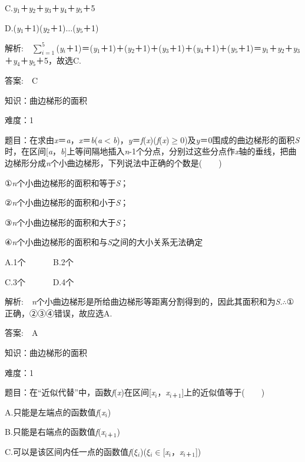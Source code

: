 \documentclass{article} %
\begin{document}
C.\textit{y}${}_{1}$＋\textit{y}${}_{2}$＋\textit{y}${}_{3}$＋\textit{y}${}_{4}$＋\textit{y}${}_{5}$＋5

D.(\textit{y}${}_{1}$＋1)(\textit{y}${}_{2}$＋1){$\dots$}(\textit{y}${}_{5}$＋1)

 解析:　$\sum\limits_{i=1}^5$(\textit{y${}_{i}$}＋1)＝(\textit{y}${}_{1}$＋1)＋(\textit{y}${}_{2}$＋1)＋(\textit{y}${}_{3}$＋1)＋(\textit{y}${}_{4}$＋1)＋(\textit{y}${}_{5}$＋1)＝\textit{y}${}_{1}$＋\textit{y}${}_{2}$＋\textit{y}${}_{3}$＋\textit{y}${}_{4}$＋\textit{y}${}_{5}$＋5，故选C.

 答案:　C



 知识：曲边梯形的面积

 难度：1

 题目：在求由\textit{x}＝\textit{a}，\textit{x}＝\textit{b}(\textit{a}$\mathrm{<}$\textit{b})，\textit{y}＝\textit{f}(\textit{x})(\textit{f}(\textit{x})$\mathrm{\ge}$0)及\textit{y}＝0围成的曲边梯形的面积\textit{S}时，在区间[\textit{a}，\textit{b}]上等间隔地插入\textit{n}-1个分点，分别过这些分点作\textit{x}轴的垂线，把曲边梯形分成\textit{n}个小曲边梯形，下列说法中正确的个数是(　　)

①\textit{n}个小曲边梯形的面积和等于\textit{S}；

②\textit{n}个小曲边梯形的面积和小于\textit{S}；

③\textit{n}个小曲边梯形的面积和大于\textit{S}；

④\textit{n}个小曲边梯形的面积和与\textit{S}之间的大小关系无法确定

A.1个　　　    B.2个　　　

C.3个　　　    D.4个

 解析:　\textit{n}个小曲边梯形是所给曲边梯形等距离分割得到的，因此其面积和为\textit{S}.$\mathrm{\therefore}$①正确，②③④错误，故应选A.

 答案:　A



 知识：曲边梯形的面积

 难度：1

 题目：在``近似代替''中，函数\textit{f}(\textit{x})在区间[\textit{x${}_{i}$}，\textit{x${}_{i}$}${}_{\textrm{＋}}$${}_{1}$]上的近似值等于(　　)

A.只能是左端点的函数值\textit{f}(\textit{x${}_{i}$})

B.只能是右端点的函数值\textit{f}(\textit{x${}_{i}$}${}_{\textrm{＋}}$${}_{1}$)

C.可以是该区间内任一点的函数值\textit{f}(\textit{$\xi$${}_{i}$})(\textit{$\xi$${}_{i}$}$\mathrm{\in}$[\textit{x${}_{i}$}，\textit{x${}_{i}$}${}_{\textrm{＋}}$${}_{1}$])
\end{document}
